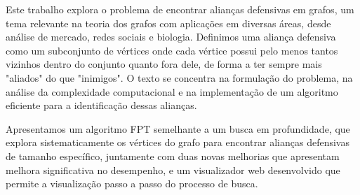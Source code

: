 \begin{resumo}

Este trabalho explora o problema de encontrar alianças defensivas em grafos, um tema relevante na teoria dos grafos com aplicações em diversas áreas, desde análise de mercado, redes sociais e biologia. Definimos uma aliança defensiva como um subconjunto de vértices onde cada vértice possui pelo menos tantos vizinhos dentro do conjunto quanto fora dele, de forma a ter sempre mais "aliados" do que "inimigos". O texto se concentra na formulação do problema, na análise da complexidade computacional e na implementação de um algoritmo eficiente para a identificação dessas alianças.

Apresentamos um algoritmo FPT semelhante a um busca em profundidade, que explora sistematicamente os vértices do grafo para encontrar alianças defensivas de tamanho específico, juntamente com duas novas melhorias que apresentam melhora significativa no desempenho, e um visualizador web desenvolvido que permite a visualização passo a passo do processo de busca.

\end{resumo}
